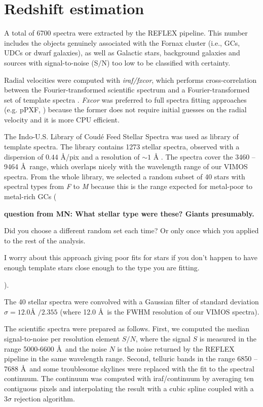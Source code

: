 \documentclass[useAMS,usenatbib]{mn2e}
\begin{document}
\section{Redshift estimation}
\label{sec:zest}

A total of 6700 spectra were extracted by the REFLEX pipeline. This number 
includes the objects genuinely associated with the Fornax cluster (i.e., GCs, 
UDCs or dwarf galaxies), as well as Galactic stars, background galaxies and 
sources with signal-to-noise (S$/$N) too low to be classified with certainty. 

Radial velocities were computed with {\it iraf/fxcor}, which performs 
cross-correlation between the Fourier-transformed scientific spectrum and a 
Fourier-transformed set of template spectra \citep{Tonry79}. {\it Fxcor} was 
preferred to full spectra fitting approaches (e.g. pPXF, 
\citealt{Cappellari04}) because the former does not require initial guesses on 
the radial velocity and it is more CPU efficient. 

The Indo-U.S. Library of Coud\'e Feed Stellar Spectra \citep{Valdes04} was used 
as library of template spectra. The library contains 1273 stellar spectra, 
observed with a dispersion of $0.44$ \AA /pix and a resolution of $\sim 1$ \AA 
. The spectra cover the 3460 -- 9464 \AA\ range, which overlaps nicely with the 
wavelength range of our VIMOS spectra. From the whole library, we selected a 
random subset of 40 stars with spectral types from \textit{F} to \textit{M} 
because this is the range expected for metal-poor to metal-rich GCs ({\bf 
question from MN: What stellar type were these? Giants presumably.

Did you choose a different random set each time? Or only once which you applied 
to the rest of the analysis.

I worry about this approach giving poor fits for stars if you don’t happen to 
have enough template stars close enough to the type you are fitting.
}). 


The 40 stellar spectra were convolved with a Gaussian filter of standard 
deviation $\sigma = 12.0\mbox{\AA\ } / 2.355$ (where 12.0 \AA\ is the FWHM 
resolution of our VIMOS spectra). 

The scientific spectra were prepared as follows. First, we computed the median 
signal-to-noise per resolution element $S/N$, where the signal $S$ is measured in the range 
5000-6600 \AA\ and the noise $N$ is the noise returned by the REFLEX pipeline 
in the same wavelength range. Second, telluric bands in the range 6850 -- 7688 
\AA\ and some troublesome skylines were replaced with the fit to the spectral 
continuum. The continuum was computed with iraf/continuum by averaging ten 
contiguous pixels and interpolating the result with a cubic spline coupled with 
a $3\sigma$ rejection algorithm.  
\end{document}
